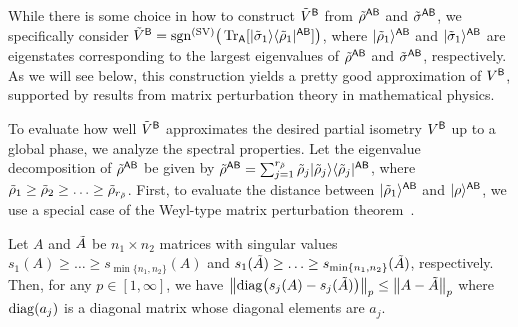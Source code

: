While there is some choice in how to construct $\tilde{V}^{\mathsf{B}}$ from $\tilde{\rho}^{{\mathsf{A}}{\mathsf{B}}}$ and $\tilde{\sigma}^{{\mathsf{A}}{\mathsf{B}}}$, we specifically consider $\tilde{V}^{\mathsf{B}} = \mathrm{sgn}^{(\rm SV)}\big(\operatorname{Tr}_{\mathsf{A}}[|\tilde{\sigma}_1\rangle\langle\tilde{\rho}_1|^{{\mathsf{A}}{\mathsf{B}}}]\big)$, where $|\tilde{\rho}_1\rangle^{{\mathsf{A}}{\mathsf{B}}}$ and $|\tilde{\sigma}_1\rangle^{{\mathsf{A}}{\mathsf{B}}}$ are eigenstates corresponding to the largest eigenvalues of $\tilde{\rho}^{{\mathsf{A}}{\mathsf{B}}}$ and $\tilde{\sigma}^{{\mathsf{A}}{\mathsf{B}}}$, respectively.
As we will see below, this construction yields a pretty good approximation of $V^{\mathsf{B}}$, supported by results from matrix perturbation theory in mathematical physics.


To evaluate how well $\tilde{V}^{\mathsf{B}}$ approximates the desired partial isometry $V^{\mathsf{B}}$ up to a global phase, we analyze the spectral properties. Let the eigenvalue decomposition of $\tilde{\rho}^{{\mathsf{A}}{\mathsf{B}}}$ be given by $\tilde{\rho}^{{\mathsf{A}}{\mathsf{B}}} = \sum_{j=1}^{r_{\tilde{\rho}}} \tilde{\rho}_j |\tilde{\rho}_j\rangle\langle\tilde{\rho}_j|^{{\mathsf{A}}{\mathsf{B}}}$, where $\tilde{\rho}_1 \geq \tilde{\rho}_2 \geq \ldots \geq \tilde{\rho}_{r_{\tilde{\rho}}}$.
First, to evaluate the distance between $|\tilde{\rho}_1\rangle^{{\mathsf{A}}{\mathsf{B}}}$ and $|\rho\rangle^{{\mathsf{A}}{\mathsf{B}}}$, we use a special case of the Weyl-type matrix perturbation theorem~\cite{Weyl1912DasAV, mirsky1960symmetric, Li1998perturvationEigSing, bhatia2013matrix}.


\begin{lemma}
\label{lem:weyl tipe perturb}
Let $A$ and $\tilde{A}$ be $n_1 \times n_2$ matrices with singular values $s_1(A) \geq \ldots \geq s_{\min\{n_1, n_2\}}(A)$ and $s_1(\tilde{A}) \geq \ldots \geq s_{\min\{n_1, n_2\}}(\tilde{A})$, respectively. Then, for any $p \in [1, \infty]$, we have $\big\|{\rm diag}\big(s_j(A) - s_j(\tilde{A})\big)\big\|_p \leq \big\|A-\tilde{A}\big\|_p$ where ${\rm diag}(a_j)$ is a diagonal matrix whose diagonal elements are $a_j$.
\end{lemma}

